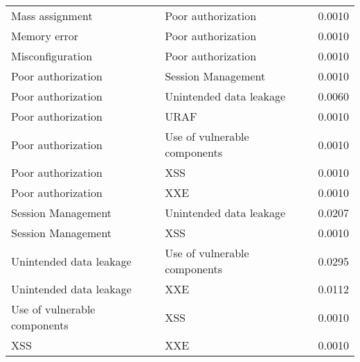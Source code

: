{\begin{longtable}{lll}
Mass assignment & Poor authorization & 0.0010\\
Memory error & Poor authorization & 0.0010\\
Misconfiguration & Poor authorization & 0.0010\\
Poor authorization & Session Management & 0.0010\\
Poor authorization & Unintended data leakage & 0.0060\\
Poor authorization & URAF & 0.0010\\
Poor authorization & Use of vulnerable components & 0.0010\\
Poor authorization & XSS & 0.0010\\
Poor authorization & XXE & 0.0010\\
Session Management & Unintended data leakage & 0.0207\\
Session Management & XSS & 0.0010\\
Unintended data leakage & Use of vulnerable components & 0.0295\\
Unintended data leakage & XXE & 0.0112\\
Use of vulnerable components & XSS & 0.0010\\
XSS & XXE & 0.0010\\
\end{longtable}
} %


